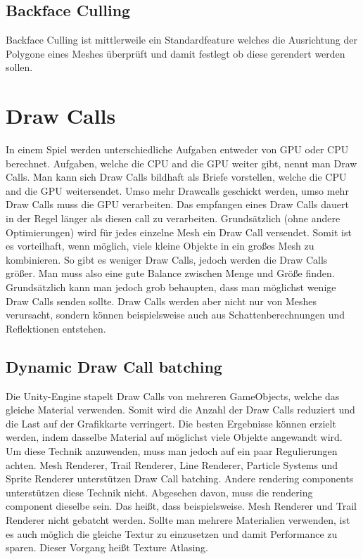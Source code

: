 \subsection{Backface Culling}
Backface Culling ist mittlerweile ein Standardfeature welches die Ausrichtung der Polygone eines Meshes überprüft und damit festlegt ob diese gerendert werden sollen.
\cite{_cryengine_culling}

\section{Draw Calls}
In einem Spiel werden unterschiedliche Aufgaben entweder von GPU oder CPU berechnet.
Aufgaben, welche die CPU and die GPU weiter gibt, nennt man Draw Calls. Man kann sich Draw Calls bildhaft als Briefe vorstellen, welche die CPU and die GPU weitersendet. Umso mehr Drawcalls geschickt werden, umso mehr Draw Calls muss die GPU verarbeiten. Das empfangen eines Draw Calls dauert in der Regel länger als diesen call zu verarbeiten. Grundsätzlich (ohne andere Optimierungen) wird für jedes einzelne Mesh ein Draw Call versendet. Somit ist es vorteilhaft, wenn möglich, viele kleine Objekte in ein großes Mesh zu kombinieren. So gibt es weniger Draw Calls, jedoch werden die Draw Calls größer. Man muss also eine gute Balance zwischen Menge und Größe finden. Grundsätzlich kann man jedoch grob behaupten, dass man möglichst wenige Draw Calls senden sollte. Draw Calls werden aber nicht nur von Meshes verursacht, sondern können beispielsweise auch aus Schattenberechnungen und Reflektionen entstehen.

\subsection{Dynamic Draw Call batching}
Die Unity-Engine stapelt Draw Calls von mehreren GameObjects, welche das gleiche Material verwenden. Somit wird die Anzahl der Draw Calls reduziert und die Last auf der Grafikkarte verringert. Die besten Ergebnisse können erzielt werden, indem dasselbe Material auf möglichst viele Objekte angewandt wird. Um diese Technik anzuwenden, muss man jedoch auf ein paar Regulierungen achten. Mesh Renderer, Trail Renderer, Line Renderer, Particle Systems und Sprite Renderer unterstützen Draw Call batching. Andere rendering components unterstützen diese Technik nicht. Abgesehen davon, muss die rendering component dieselbe sein. Das heißt, dass beispielsweise. Mesh Renderer und Trail Renderer nicht gebatcht werden. Sollte man mehrere Materialien verwenden, ist es auch möglich die gleiche Textur zu einzusetzen und damit Performance zu sparen. Dieser Vorgang heißt Texture Atlasing.

